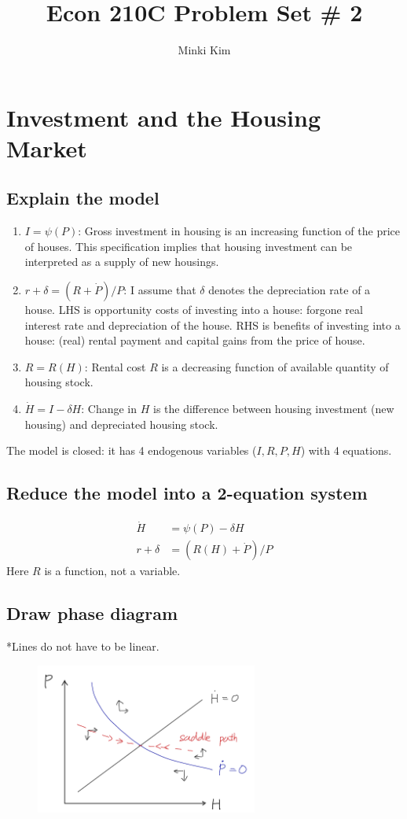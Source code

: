 \documentclass[11pt]{amsart}
\title{Econ 210C Problem Set \# 2}
\author{Minki Kim}
\begin{document}
\maketitle

\section{Investment and the Housing Market}
\subsection{Explain the model}
\begin{enumerate}
	\item $I = \psi (P)$: Gross investment in housing is an increasing function of the price of houses. This specification implies that housing investment can be interpreted as a supply of new housings. 
	\item $r + \delta = (R + \dot{P})/P$: I assume that $\delta$ denotes the depreciation rate of a house. LHS is opportunity costs of investing into a house: forgone real interest rate and depreciation of the house. RHS is benefits of investing into a house: (real) rental payment and capital gains from the price of house. 
	\item $R = R(H)$: Rental cost $R$ is a decreasing function of available quantity of housing stock. 
	\item $\dot{H} = I - \delta H$: Change in $H$ is the difference between housing investment (new housing) and depreciated housing stock. 
\end{enumerate}
The model is closed: it has 4 endogenous variables ($I,R,P,H$) with 4 equations.

\subsection{Reduce the model into a 2-equation system}
\begin{align*}
\dot{H} &= \psi(P) - \delta H \\
r + \delta &= (R(H) + \dot{P}) / P
\end{align*}
Here $R$ is a function, not a variable. 
\subsection{Draw phase diagram}
*Lines do not have to be linear. 
\begin{figure}[H]
	\centering
	\includegraphics[width=0.65\textwidth]{1c_Minki.png}
\end{figure}
\end{document}
